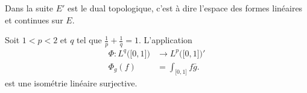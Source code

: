 Dans la suite \( E'\) est le dual topologique, c'est à dire l'espace des formes linéaires et continues sur \( E\).

\begin{proposition} \label{PropOAVooYZSodR}
    Soit \( 1<p<2\) et \( q\) tel que \( \frac{1}{ p }+\frac{1}{ q }=1\). L'application
    \begin{equation}
        \begin{aligned}
            \Phi\colon L^q\big( \mathopen[ 0 , 1 \mathclose] \big)&\to  L^p\big( \mathopen[ 0 , 1 \mathclose] \big)'  \\
            \Phi_g(f)&= \int_{\mathopen[ 0 , 1 \mathclose]}f\bar g.
        \end{aligned}
    \end{equation}
    est une isométrie linéaire surjective.
\end{proposition}


